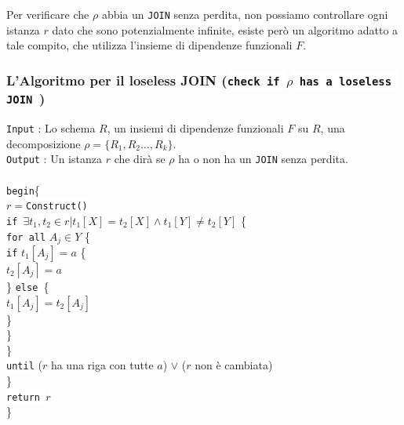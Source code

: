 \documentclass[12pt, letterpaper]{article}
\newcommand{\code}[1]{\colorbox{light-gray}{\texttt{#1}}}
\newcommand{\codee}[1]{\colorbox{white}{\texttt{#1}}}
\newcommand{\acc}{\\\hphantom{}\\}
\begin{document}
Per verificare che \(\rho\) abbia un \codee{JOIN} senza perdita, non possiamo controllare ogni istanza \(r\) dato che sono 
potenzialmente infinite, esiste però un algoritmo adatto a tale compito, che utilizza 
l'insieme di dipendenze funzionali \(F\).
\subsubsection{L'Algoritmo per il loseless JOIN (\codee{check if }\(\rho\)\codee{ has a loseless JOIN })}
\code{Input} : Lo schema \(R\), un insiemi di dipendenze funzionali \(F\) su \(R\), una decomposizione \(\rho=\{R_1,R_2\dots,R_k\}\).\\
\code{Output} : Un istanza \(r\) che dirà se \(\rho\) ha o non ha un \codee{JOIN} senza perdita.\acc
\hphantom{ident}\codee{begin}\{\\
\hphantom{ident}\hphantom{ident} \(r=\)\codee{Construct()}\\ 
\hphantom{ident}\hphantom{ident}\hphantom{ident} \codee{if }\(\exists t_1,t_2\in r|t_1[X]=t_2[X]\land t_1[Y]\ne t_2[Y]\) \{\\ 
\hphantom{ident}\hphantom{ident}\hphantom{ident}\hphantom{ident} \codee{for all} \( A_j\in Y \) \{ \\  
\hphantom{ident}\hphantom{ident}\hphantom{ident}\hphantom{ident}\hphantom{ident} \codee{if} \(t_1[A_j]=a\) \{ \\
\hphantom{ident}\hphantom{ident}\hphantom{ident}\hphantom{ident}\hphantom{ident}\(t_2[A_j]=a\) \\
\hphantom{ident}\hphantom{ident}\hphantom{ident}\hphantom{ident}\hphantom{ident} \} \codee{else }\{\\
\hphantom{ident}\hphantom{ident}\hphantom{ident}\hphantom{ident}\hphantom{ident} \(t_1[A_j]=t_2[A_j]\)\\
\hphantom{ident}\hphantom{ident}\hphantom{ident}\hphantom{ident}\hphantom{ident} \} \\
\hphantom{ident}\hphantom{ident}\hphantom{ident}\hphantom{ident} \} \\
\hphantom{ident}\hphantom{ident}\hphantom{ident}\} \\
\hphantom{ident}\hphantom{ident}\hphantom{ident} \codee{until} (\(r\) ha una riga con tutte \(a\)) \(\lor\) (\(r\) non è cambiata)\\
\hphantom{ident}\hphantom{ident} \}\\ 
\hphantom{ident}\hphantom{ident} \codee{return }\(r\)\\ 
\hphantom{ident}\}\acc
\end{document}
